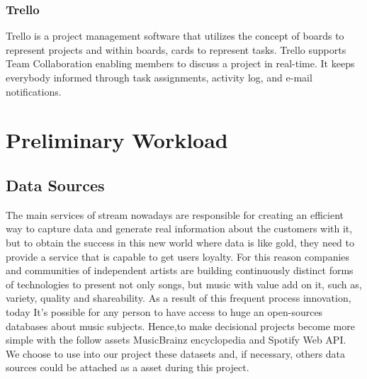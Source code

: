 \documentclass[12pt]{article}
\begin{document}
\subsubsection{Trello}
Trello\cite{trello} is a project management software that utilizes the concept of boards to represent
projects and within boards, cards to represent tasks. Trello supports Team Collaboration
enabling members to discuss a project in real-time. It keeps everybody informed through
task assignments, activity log, and e-mail notifications.\cite{tutorialspoint}



\section{Preliminary Workload}

\subsection{Data Sources}

The main services of stream nowadays are responsible for creating an efficient way to capture data and generate real information about the customers with it, but to obtain the success in this new world where data is like gold, they need to provide a service that is capable to get users loyalty. For this reason companies and communities of independent artists are building continuously distinct forms of technologies to present not only songs, but music with value add on it, such as, variety, quality and shareability. As a result of this frequent process innovation, today It's possible for any person to have access to huge an open-sources databases about music subjects. Hence,to make decisional projects become more simple with the follow assets MusicBrainz encyclopedia\cite{musicbrainz} and Spotify Web API. We choose to use into our project these datasets and, if necessary, others data sources could be attached as a asset during this project.\\
\end{document}
